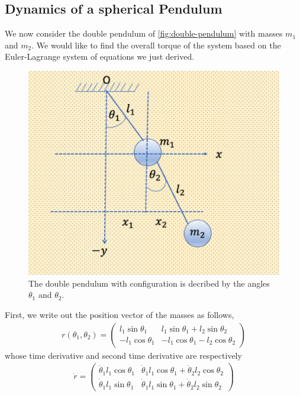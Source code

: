 \subsection{Dynamics of a spherical Pendulum}
%
We now consider the double pendulum of \autoref{fig:double-pendulum} with masses $m_1$ and $m_2$. We would like to find the overall torque of the system based on the Euler-Lagrange system of equations we just derived.
%
\begin{figure}[tb!]
	\centering
	\includegraphics[width=.8\columnwidth]{figures/double-pendulum.png}
	\caption{The double pendulum with configuration is decribed by the angles $\theta_1$ and $\theta_2$.}
	\label{fig:double-pendulum}
\end{figure}
%
First, we write out the position vector of the masses as follows,
%
\begin{align}
	r(\theta_1, \theta_2) = \left(\begin{array}{c|c}
	l_1 \sin \theta_1 & l_1 \sin \theta_1  + l_2 \sin \theta_2
	\\
	-l_1 \cos \theta_1 & -l_1 \cos \theta_1  - l_2 \cos \theta_2
	\end{array}\right)
\end{align}
%
whose time derivative and second time derivative are respectively
%
\begin{align}
	\dot{r} = \left(\begin{array}{c|c}
	\dot{\theta}_1 l_1 \cos \theta_1 & \dot{\theta}_1 l_1 \cos \theta_1  + \dot{\theta}_2 l_2 \cos \theta_2
	\\
	\dot{\theta}_1 l_1 \sin \theta_1 & \dot{\theta}_1 l_1 \sin \theta_1  + \dot{\theta}_2 l_2 \sin \theta_2
	\end{array}\right)
\end{align}
